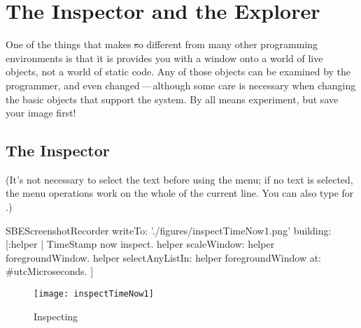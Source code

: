 \documentclass[a4paper,10pt,twoside]{book}
\begin{document}
\begin{comment}
One of the most important functions for a version management tool is to let the user build a package out of a number of smaller packages.
For example, a complex package like refactoring support might be made up of the refactoring engine itself, a GUI, and the services interface that makes it accessible to other tools.  
Each of these components goes in its own package, and yet,  for the convenience of the user, the whole needs to be available as a single package.

How is this accomplished using Monticello?  \ab{How indeed?  I hope that someone can write this section, because I haven't a clue, but would really like to know.}
\end{comment}

\section{The Inspector and the Explorer}
\label{sec:inspector} %

One of the things that makes \st so different from many other programming environments is that it is provides you with a window onto a world of live objects, not a world of static code.
Any of those objects can be examined by the programmer, and even changed\,---\,although some care is necessary when changing the basic objects that support the system.  
By all means experiment, but save your image first!

\subsection{The Inspector}

(It's not necessary to select the text before using the menu; if no text is selected, the menu operations work on the whole of the current line.
You can also type  for .)

\begin{ExecuteSmalltalkScript}
SBEScreenshotRecorder writeTo: './figures/inspectTimeNow1.png' building: [:helper |
	TimeStamp now inspect.
	helper scaleWindow: helper foregroundWindow.
	helper selectAnyListIn: helper foregroundWindow at: #utcMicroseconds.
]
\end{ExecuteSmalltalkScript}
\begin{figure}[btp]
	\begin{center}
		\texttt{[image: inspectTimeNow1]}
	\end{center}
	\caption{Inspecting }
	\label{fig:inspectTimeNow1}
\end{figure}
\end{document}
